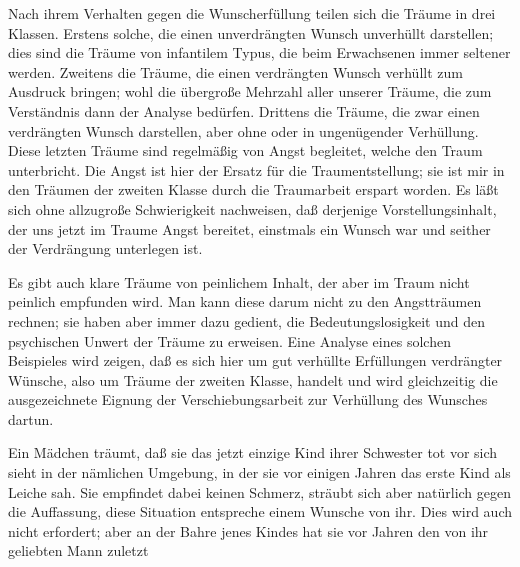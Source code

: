 \documentclass{article}
\begin{document}
         
            
            
            
        \pstart
        Nach ihrem Verhalten gegen die Wunscherfüllung teilen sich die Träume in drei
               Klassen. Erstens solche, die einen unverdrängten Wunsch unverhüllt darstellen; dies sind die Träume von
               infantilem Typus, die beim Erwachsenen immer seltener werden. Zweitens die
               Träume, die einen verdrängten Wunsch verhüllt zum Ausdruck bringen; wohl die übergroße
               Mehrzahl aller unserer Träume, die zum Verständnis dann der Analyse bedürfen.
               Drittens die Träume, die zwar einen verdrängten Wunsch darstellen, aber ohne oder in ungenügender Verhüllung.
               Diese letzten Träume sind regelmäßig von
               Angst begleitet, welche den Traum unterbricht. Die
               Angst ist hier der Ersatz für die Traumentstellung; sie ist mir in den
               Träumen der zweiten Klasse durch die Traumarbeit erspart worden. Es läßt sich
               ohne allzugroße Schwierigkeit nachweisen, daß derjenige Vorstellungsinhalt, der
               uns jetzt im Traume Angst bereitet, einstmals ein Wunsch war und seither der
               Verdrängung unterlegen ist.
        \pend
    
            
        \pstart
        Es gibt auch klare Träume von peinlichem Inhalt, der aber im Traum nicht
               peinlich empfunden wird. Man kann diese darum nicht zu den Angstträumen rechnen;
               sie haben aber immer dazu gedient, die Bedeutungslosigkeit und den psychischen
               Unwert der Träume zu erweisen. Eine Analyse eines solchen Beispieles wird
               zeigen, daß es sich hier um gut verhüllte Erfüllungen
                  verdrängter Wünsche, also um Träume der zweiten Klasse,
               handelt und wird gleichzeitig die ausgezeichnete Eignung der Verschiebungsarbeit zur Verhüllung des Wunsches dartun.
        \pend
    
            
        \pstart
        Ein Mädchen träumt, daß sie das jetzt einzige Kind ihrer Schwester tot vor sich
               sieht in der nämlichen Umgebung, in der sie vor einigen Jahren das erste Kind
               als Leiche sah. Sie empfindet dabei keinen Schmerz, sträubt sich aber
               natürlich gegen die Auffassung, diese Situation entspreche einem Wunsche
               von ihr. Dies wird auch nicht erfordert; aber an der Bahre jenes Kindes hat
               sie vor Jahren den von ihr geliebten Mann zuletzt
        \pend
    
\end{document}
